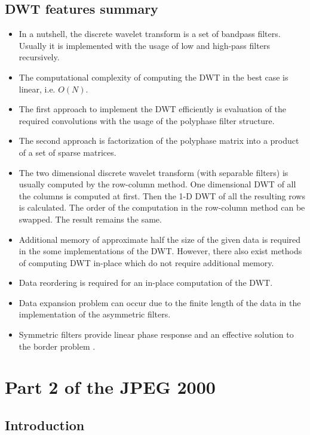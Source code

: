 \subsection{DWT features summary}

\begin{itemize}
    \item In a nutshell, the discrete wavelet transform is a set of bandpass filters. Usually it is implemented
    with the usage of low and high-pass filters recursively.
    \item The computational complexity of computing the DWT in the best case is linear, i.e. $O(N)$.
    \item The first approach to implement the DWT efficiently is evaluation of the required convolutions
    with the usage of the polyphase filter structure.
    \item The second approach is factorization of the polyphase matrix into a product of a set of sparse matrices.
    \item The two dimensional discrete wavelet transform (with separable filters) is usually computed by the row-column method.
    One dimensional DWT of all the columns is computed at first. Then the 1-D DWT of all the resulting
    rows is calculated. The order of the computation in the row-column method can be swapped. The result remains the same.
    \item Additional memory of approximate half the size of the given data is required in the some implementations of the DWT.
    However, there also exist methods of computing DWT in-place which do not require additional memory. 
    \item Data reordering is required for an in-place computation of the DWT.
    \item Data expansion problem can occur due to the finite length of the data in the implementation of the asymmetric filters.
    \item Symmetric filters provide linear phase response and an effective solution to the border problem \cite{dwt_impl}.
\end{itemize}

\section{Part 2 of the JPEG 2000}


\subsection{Introduction}

